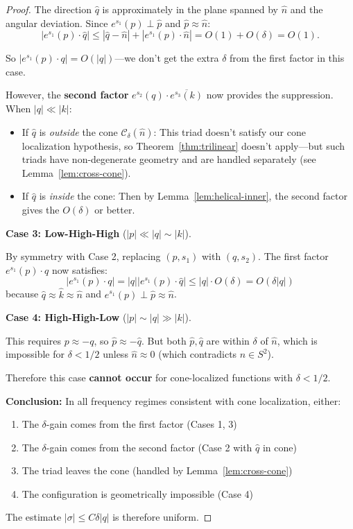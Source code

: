 \documentclass[11pt]{article}
\theoremstyle{definition}
\begin{document}
\begin{proof}
The direction $\hat{q}$ is approximately in the plane spanned by $\hat{n}$ and the angular deviation. Since $e^{s_1}(p) \perp \hat{p}$ and $\hat{p} \approx \hat{n}$:
\begin{equation}
|e^{s_1}(p) \cdot \hat{q}| \leq |\hat{q} - \hat{n}| + |e^{s_1}(p) \cdot \hat{n}| = O(1) + O(\delta) = O(1).
\end{equation}

So $|e^{s_1}(p) \cdot q| = O(|q|)$---we don't get the extra $\delta$ from the first factor in this case.

However, the \textbf{second factor} $e^{s_2}(q) \cdot \overline{e^{s_3}(k)}$ now provides the suppression. When $|q| \ll |k|$:
\begin{itemize}
\item If $\hat{q}$ is \emph{outside} the cone $\mathcal{C}_\delta(\hat{n})$: This triad doesn't satisfy our cone localization hypothesis, so Theorem~\ref{thm:trilinear} doesn't apply---but such triads have non-degenerate geometry and are handled separately (see Lemma~\ref{lem:cross-cone}).
\item If $\hat{q}$ is \emph{inside} the cone: Then by Lemma~\ref{lem:helical-inner}, the second factor gives the $O(\delta)$ or better.
\end{itemize}

\textbf{Case 3: Low-High-High} ($|p| \ll |q| \sim |k|$).

By symmetry with Case 2, replacing $(p, s_1)$ with $(q, s_2)$. The first factor $e^{s_1}(p) \cdot q$ now satisfies:
\begin{equation}
|e^{s_1}(p) \cdot q| = |q| |e^{s_1}(p) \cdot \hat{q}| \leq |q| \cdot O(\delta) = O(\delta |q|)
\end{equation}
because $\hat{q} \approx \hat{k} \approx \hat{n}$ and $e^{s_1}(p) \perp \hat{p} \approx \hat{n}$.

\textbf{Case 4: High-High-Low} ($|p| \sim |q| \gg |k|$).

This requires $p \approx -q$, so $\hat{p} \approx -\hat{q}$. But both $\hat{p}, \hat{q}$ are within $\delta$ of $\hat{n}$, which is impossible for $\delta < 1/2$ unless $\hat{n} \approx 0$ (which contradicts $\hat{n} \in S^2$).

Therefore this case \textbf{cannot occur} for cone-localized functions with $\delta < 1/2$.

\textbf{Conclusion:} In all frequency regimes consistent with cone localization, either:
\begin{enumerate}
\item The $\delta$-gain comes from the first factor (Cases 1, 3)
\item The $\delta$-gain comes from the second factor (Case 2 with $\hat{q}$ in cone)
\item The triad leaves the cone (handled by Lemma~\ref{lem:cross-cone})
\item The configuration is geometrically impossible (Case 4)
\end{enumerate}

The estimate $|\sigma| \leq C\delta|q|$ is therefore uniform.
\end{proof}
\end{document}
